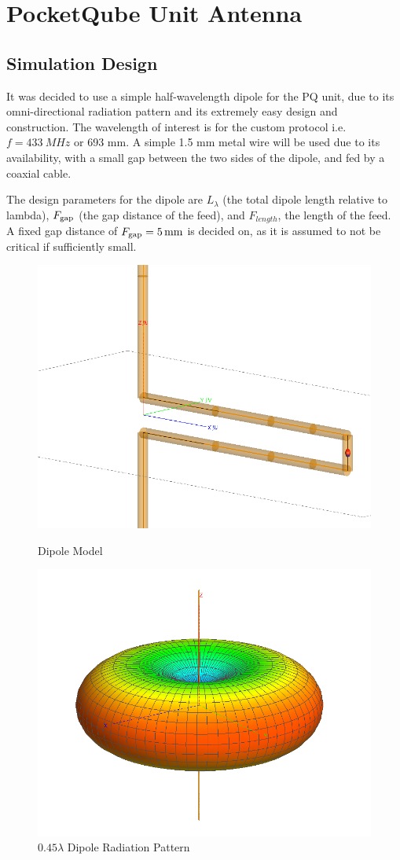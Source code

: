 \graphicspath{{./figures}}

\section{PocketQube Unit Antenna}
\subsection{Simulation Design}
It was decided to use a simple half-wavelength dipole for the PQ unit, due to its omni-directional radiation pattern and its extremely easy design and construction. The wavelength of interest is for the custom protocol i.e. $f = \SI{433}{MHz}$ or 693 mm. A simple 1.5 mm metal wire will be used due to its availability, with a small gap between the two sides of the dipole, and fed by a coaxial cable.

The design parameters for the dipole are $L_\lambda$ (the total dipole length relative to lambda), $F_{\textnormal{gap}}$ (the gap distance of the feed), and $F_{length}$, the length of the feed. A fixed gap distance of $F_{\textnormal{gap}} = \SI{5}{mm}$ is decided on, as it is assumed to not be critical if sufficiently small.

\begin{figure}[!htb]
  \begin{minipage}{.49\textwidth}
    \centering
    \includegraphics[width=0.65\linewidth]{dipole1_modelMesh}
    \caption{Dipole Model}
    \label{fig:dipole1_modelMesh}
  \end{minipage}
  \begin{minipage}{.49\textwidth}
    \centering
    \includegraphics[width=0.65\linewidth]{dipole1_pattern_433MHz}
    \caption{$0.45 \lambda$ Dipole Radiation Pattern}
    \label{fig:dipole1_pattern_433MHz}
  \end{minipage}
\end{figure}

